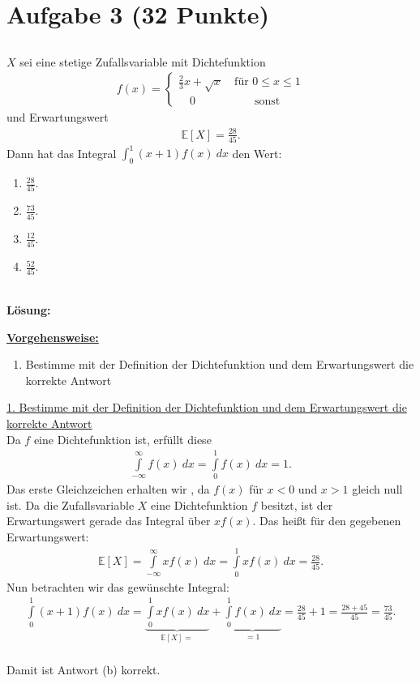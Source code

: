 \section*{Aufgabe 3 (32 Punkte)}
\vspace{0.4cm}
\subsection*{}
$ X $ sei eine stetige Zufallsvariable mit Dichtefunktion
\begin{align*}
f(x) = 
\begin{cases}
\frac{2}{3} x + \sqrt{x} &\ \textrm{für } 0 \leq x \leq 1\\
\quad 0 &\qquad \textrm{sonst}
\end{cases}
\end{align*}
und Erwartungswert
\begin{align*}
\mathbb{E}[X] = \frac{28}{45}.
\end{align*}
Dann hat das Integral $ \int_0^1 (x+1) f(x) \ dx $ den Wert:
\renewcommand{\labelenumi}{(\alph{enumi})}
\begin{enumerate}
	\item 
	$\frac{28}{45}$.
	\item
	$\frac{73}{45}$.
	\item
	$\frac{12}{45}$.
	\item
	$\frac{52}{45}$.
\end{enumerate}
\ \\
\textbf{Lösung:}
\begin{mdframed}
\underline{\textbf{Vorgehensweise:}}
\renewcommand{\labelenumi}{\theenumi.}
\begin{enumerate}
\item Bestimme mit der Definition der Dichtefunktion und dem Erwartungswert die korrekte Antwort 
\end{enumerate}
\end{mdframed}

\underline{1. Bestimme mit der Definition der Dichtefunktion und dem Erwartungswert die korrekte Antwort}\\
Da $ f $ eine Dichtefunktion ist, erfüllt diese 
\begin{align*}
\int \limits_{- \infty}^\infty f(x) \ dx
=
\int \limits_{0}^1 f(x) \ dx = 1.
\end{align*}
Das erste Gleichzeichen erhalten wir , da $ f(x) $ für $ x < 0  $ und $ x > 1 $ gleich null ist.
Da die Zufallsvariable $ X $ eine Dichtefunktion $ f $ besitzt, ist der Erwartungswert gerade das Integral über $ x f(x) $. Das heißt für den gegebenen Erwartungswert:
\begin{align*}
\mathbb{E}[X] = 
\int \limits_{- \infty}^\infty x f(x) \ dx = 
\int \limits_{0}^1 x f(x) \ dx
= \frac{28}{45}.
\end{align*}
Nun betrachten wir das gewünschte Integral:
\begin{align*}
\int \limits_0^1 (x+1) f(x) \ dx
=
\underbrace{\int \limits_0^1 x  f(x) \ dx}_{\mathbb{E}[X] =}
 + 
\underbrace{\int \limits_0^1  f(x) \ dx}_{= 1} 
=
\frac{28}{45} + 1 = 
\frac{28+ 45}{45} = \frac{73}{45}.
 \end{align*}
\ \\
Damit ist Antwort (b) korrekt.
\newpage

